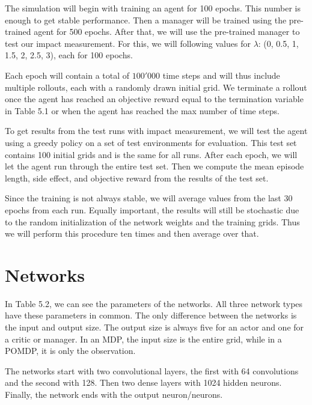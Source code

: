 \documentclass[12pt,A4]{report}
\theoremstyle{definition}
\begin{document}
The simulation will begin with training an agent for 100 epochs. This number is enough to get stable performance. Then a manager will be trained using the pre-trained agent for 500 epochs. After that, we will use the pre-trained manager to test our impact measurement. For this, we will following values for $\lambda$: (0, 0.5, 1, 1.5, 2, 2.5, 3), each for 100 epochs. 

Each epoch will contain a total of $100'000$ time steps and will thus include multiple rollouts, each with a randomly drawn initial grid. We terminate a rollout once the agent has reached an objective reward equal to the termination variable in Table 5.1 or when the agent has reached the max number of time steps.

To get results from the test runs with impact measurement, we will test the agent using a greedy policy on a set of test environments for evaluation. This test set contains 100 initial grids and is the same for all runs. After each epoch, we will let the agent run through the entire test set. Then we compute the mean episode length, side effect, and objective reward from the results of the test set. 

Since the training is not always stable, we will average values from the last 30 epochs from each run. Equally important, the results will still be stochastic due to the random initialization of the network weights and the training grids. Thus we will perform this procedure ten times and then average over that. 

\section{Networks}
In Table 5.2, we can see the parameters of the networks. All three network types have these parameters in common. The only difference between the networks is the input and output size. The output size is always five for an actor and one for a critic or manager. In an MDP, the input size is the entire grid, while in a POMDP, it is only the observation. 

The networks start with two convolutional layers, the first with 64 convolutions and the second with 128. Then two dense layers with 1024 hidden neurons. Finally, the network ends with the output neuron/neurons.
\end{document}

